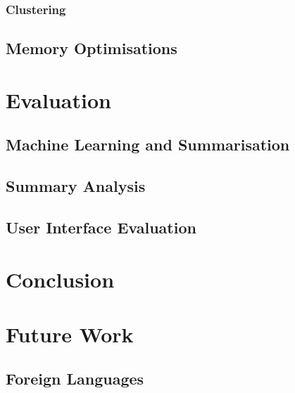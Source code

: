 \documentclass[12pt]{article}
\begin{document}
\subsubsection{Clustering}

\subsection{Memory Optimisations}


\newpage

\section{Evaluation}

\subsection{Machine Learning and Summarisation}

\subsection{Summary Analysis}

\subsection{User Interface Evaluation}


\newpage

\section{Conclusion}


\newpage

\section{Future Work}

\subsection{Foreign Languages}
\end{document}
